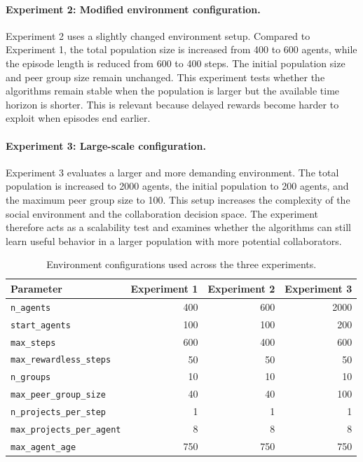 \documentclass[english,bachelor]{hsluthesis}
\begin{document}
\paragraph{Experiment 2: Modified environment configuration.}
Experiment 2 uses a slightly changed environment setup. Compared to Experiment 1, the total population size is increased from 400 to 600 agents, while the episode length is reduced from 600 to 400 steps. The initial population size and peer group size remain unchanged. This experiment tests whether the algorithms remain stable when the population is larger but the available time horizon is shorter. This is relevant because delayed rewards become harder to exploit when episodes end earlier.

\paragraph{Experiment 3: Large-scale configuration.}
Experiment 3 evaluates a larger and more demanding environment. The total population is increased to 2000 agents, the initial population to 200 agents, and the maximum peer group size to 100. This setup increases the complexity of the social environment and the collaboration decision space. The experiment therefore acts as a scalability test and examines whether the algorithms can still learn useful behavior in a larger population with more potential collaborators.

\begin{table}[H]
\centering
\begin{tabular}{l r r r}
\hline
Parameter & Experiment 1 & Experiment 2 & Experiment 3 \\
\hline
\texttt{n\_agents} & 400 & 600 & 2000 \\
\texttt{start\_agents} & 100 & 100 & 200 \\
\texttt{max\_steps} & 600 & 400 & 600 \\
\texttt{max\_rewardless\_steps} & 50 & 50 & 50 \\
\texttt{n\_groups} & 10 & 10 & 10 \\
\texttt{max\_peer\_group\_size} & 40 & 40 & 100 \\
\texttt{n\_projects\_per\_step} & 1 & 1 & 1 \\
\texttt{max\_projects\_per\_agent} & 8 & 8 & 8 \\
\texttt{max\_agent\_age} & 750 & 750 & 750 \\
\hline
\end{tabular}
\caption{Environment configurations used across the three experiments.}
\label{tab:env_configs}
\end{table}
\end{document}
